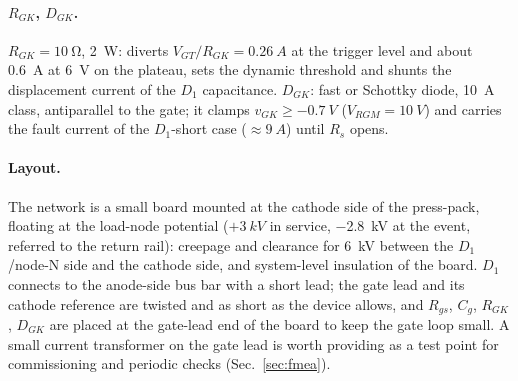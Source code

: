 \documentclass[11pt,a4paper]{article}
\begin{document}
\paragraph{$R_{GK}$, $D_{GK}$.} $R_{GK} = \SI{10}{\ohm}$, \SI{2}{W}: diverts $V_{GT}/R_{GK} =
\SI{0.26}{A}$ at the trigger level and about \SI{0.6}{A} at \SI{6}{V} on the plateau, sets the
dynamic threshold and shunts the displacement current of the $D_1$ capacitance. $D_{GK}$:
fast or Schottky diode, \SI{10}{A} class, antiparallel to the gate; it clamps $v_{GK} \ge
\SI{-0.7}{V}$ ($V_{RGM} = \SI{10}{V}$) and carries the fault current of the $D_1$-short case
($\approx \SI{9}{A}$) until $R_s$ opens.

\paragraph{Layout.} The network is a small board mounted at the cathode side of the press-pack,
floating at the load-node potential ($+\SI{3}{kV}$ in service, \SI{-2.8}{kV} at the event,
referred to the return rail): creepage and clearance for \SI{6}{kV} between the $D_1$/node-N
side and the cathode side, and system-level insulation of the board. $D_1$ connects to the
anode-side bus bar with a short lead; the gate lead and its cathode reference are twisted and as
short as the device allows, and $R_{gs}$, $C_g$, $R_{GK}$, $D_{GK}$ are placed at the gate-lead
end of the board to keep the gate loop small. A small current transformer on the gate lead is
worth providing as a test point for commissioning and periodic checks (Sec.~\ref{sec:fmea}).
\end{document}

